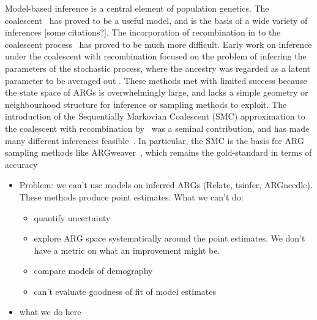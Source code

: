 \documentclass{article}
\begin{document}
Model-based inference is a central element of population genetics.
The coalescent~\citep{kingman_genealogy_1982,kingman_coalescent_1982,hudson_testing_1983,
tajima_evolutionary_1983} has proved to be a useful model, and is the
basis of a wide variety of inferences [some citations?]. The incorporation
of recombination in to the coalescent process~\citep{hudson_properties_1983}
has proved to be much more difficult.
Early work on inference under the coalescent with recombination
focused on the problem of
inferring the parameters of the
stochastic process, where the ancestry was regarded as a
latent parameter to be averaged out
\citep[e.g.][]{griffiths_ancestral_1996,kuhner_maximum_2000,
nielsen_estimation_2000,
fearnhead_estimating_2001}.
These methods met with limited success
because the state space of ARGs is overwhelmingly large, and
lacks a simple geometry or neighbourhood structure for inference or
sampling methods to  exploit.
The introduction of the Sequentially Markovian Coalescent (SMC)
approximation to the coalescent with recombination
by~\cite{mcvean_approximating_2005} was a seminal contribution,
and has made many different inferences
feasible~\citep[e.g.]{li_inference_2011,paul_accurate_2011,schiffels_inferring_2014}.
In particular, the SMC is the basis for ARG sampling methods
like ARGweaver~\citep{rasmussen_genome-wide_2014}, which remains the
gold-standard in terms of accuracy~\citep{brandt2022evaluation}


\begin{itemize}
    \item Problem: we can't use models on inferred ARGs (Relate, tsinfer, ARGneedle). These methods produce point estimates. What we can't do:
        \begin{itemize}
            \item quantify uncertainty
            \item explore ARG space systematically around the point estimates. We don't have a metric on what an improvement might be.
            \item compare models of demography
            \item can't evaluate goodness of fit of model estimates
        \end{itemize}
    \item what we do here
\end{itemize}
\end{document}
